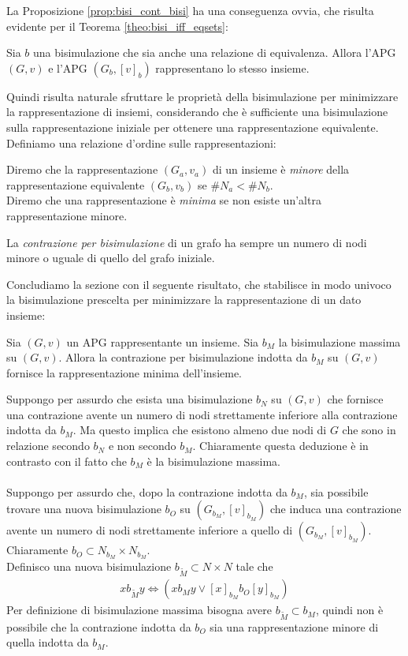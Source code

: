 La Proposizione \ref*{prop:bisi_cont_bisi} ha una conseguenza ovvia, che risulta evidente per il Teorema \ref*{theo:bisi_iff_eqsets}:
\begin{corollary}
    Sia $b$ una bisimulazione che sia anche una relazione di equivalenza. Allora l'APG $(G, v)$ e l'APG $(G_b, [v]_b)$ rappresentano lo stesso insieme.
\end{corollary}
Quindi risulta naturale sfruttare le proprietà della bisimulazione per minimizzare la rappresentazione di insiemi, considerando che è sufficiente una bisimulazione sulla rappresentazione iniziale per ottenere una rappresentazione equivalente. Definiamo una relazione d'ordine sulle rappresentazioni:
\begin{definition}
    Diremo che la rappresentazione $(G_a, v_a)$ di un insieme è \emph{minore} della rappresentazione equivalente $(G_b, v_b)$ se $\#N_a < \#N_b$.\\
    Diremo che una rappresentazione è \emph{minima} se non esiste un'altra rappresentazione minore.
\end{definition}
\begin{observation}
    La \emph{contrazione per bisimulazione} di un grafo ha sempre un numero di nodi minore o uguale di quello del grafo iniziale.
\end{observation}
Concludiamo la sezione con il seguente risultato, che stabilisce in modo univoco la bisimulazione prescelta per minimizzare la rappresentazione di un dato insieme:
\begin{theorem}
    Sia $(G,v)$ un APG rappresentante un insieme. Sia $b_M$ la bisimulazione massima su $(G,v)$. Allora la contrazione per bisimulazione indotta da $b_M$ su $(G,v)$ fornisce la rappresentazione minima dell'insieme.
\end{theorem}
\begin{proof2}
    Suppongo per assurdo che esista una bisimulazione $b_N$ su $(G,v)$ che fornisce una contrazione avente un numero di nodi strettamente inferiore alla contrazione indotta da $b_M$. Ma questo implica che esistono almeno due nodi di $G$ che sono in relazione secondo $b_N$ e non secondo $b_M$. Chiaramente questa deduzione è in contrasto con il fatto che $b_M$ è la bisimulazione massima.\\\\
    Suppongo per assurdo che, dopo la contrazione indotta da $b_M$, sia possibile trovare una nuova bisimulazione $b_O$ su $(G_{b_M}, [v]_{b_M})$ che induca una contrazione avente un numero di nodi strettamente inferiore a quello di $(G_{b_M}, [v]_{b_M})$. Chiaramente $b_O \subset N_{b_M} \times N_{b_M}$.\\
    Definisco una nuova bisimulazione $b_{\widetilde{M}} \subset N \times N$ tale che
    \begin{gather*}
        x b_{\widetilde{M}} y \iff (x b_M y \lor [x]_{b_M} b_O [y]_{b_M})
    \end{gather*}
    Per definizione di bisimulazione massima bisogna avere $b_{\widetilde{M}} \subset b_M$, quindi non è possibile che la contrazione indotta da $b_O$ sia una rappresentazione minore di quella indotta da $b_M$.
\end{proof2}
